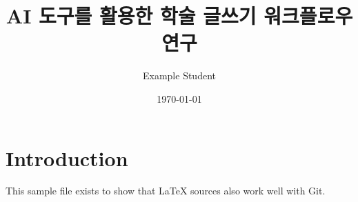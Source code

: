 \documentclass[12pt]{article}
\title{AI 도구를 활용한 학술 글쓰기 워크플로우 연구}
\author{Example Student}
\date{\today}
\begin{document}
\maketitle

\section{Introduction}

This sample file exists to show that LaTeX sources also work well with Git.
\end{document}
